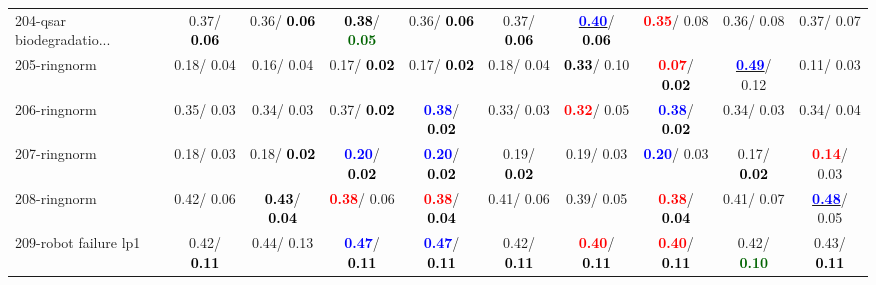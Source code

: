 \begin{table}[h]
\begin{center}
{\begin{tabular}{lc|c|c|c|c|c|c|c|c}
204-qsar biodegradatio... &   0.37/\textcolor{black}{\textbf{  0.06}} &   0.36/\textcolor{black}{\textbf{  0.06}} & \textcolor{black}{\textbf{  0.38}}/\textcolor{darkgreen}{\textbf{  0.05}} &   0.36/\textcolor{black}{\textbf{  0.06}} &   0.37/\textcolor{black}{\textbf{  0.06}} & \underline{\textcolor{blue}{\textbf{  0.40}}}/\textcolor{black}{\textbf{  0.06}} & \textcolor{red}{\textbf{  0.35}}/  0.08 &   0.36/  0.08 &   0.37/  0.07 \\
205-ringnorm &   0.18/  0.04 &   0.16/  0.04 &   0.17/\textcolor{black}{\textbf{  0.02}} &   0.17/\textcolor{black}{\textbf{  0.02}} &   0.18/  0.04 & \textcolor{black}{\textbf{  0.33}}/  0.10 & \textcolor{red}{\textbf{  0.07}}/\textcolor{black}{\textbf{  0.02}} & \underline{\textcolor{blue}{\textbf{  0.49}}}/  0.12 &   0.11/  0.03 \\
206-ringnorm &   0.35/  0.03 &   0.34/  0.03 &   0.37/\textcolor{black}{\textbf{  0.02}} & \textcolor{blue}{\textbf{  0.38}}/\textcolor{black}{\textbf{  0.02}} &   0.33/  0.03 & \textcolor{red}{\textbf{  0.32}}/  0.05 & \textcolor{blue}{\textbf{  0.38}}/\textcolor{black}{\textbf{  0.02}} &   0.34/  0.03 &   0.34/  0.04 \\ \hline
207-ringnorm &   0.18/  0.03 &   0.18/\textcolor{black}{\textbf{  0.02}} & \textcolor{blue}{\textbf{  0.20}}/\textcolor{black}{\textbf{  0.02}} & \textcolor{blue}{\textbf{  0.20}}/\textcolor{black}{\textbf{  0.02}} &   0.19/\textcolor{black}{\textbf{  0.02}} &   0.19/  0.03 & \textcolor{blue}{\textbf{  0.20}}/  0.03 &   0.17/\textcolor{black}{\textbf{  0.02}} & \textcolor{red}{\textbf{  0.14}}/  0.03 \\
208-ringnorm &   0.42/  0.06 & \textcolor{black}{\textbf{  0.43}}/\textcolor{black}{\textbf{  0.04}} & \textcolor{red}{\textbf{  0.38}}/  0.06 & \textcolor{red}{\textbf{  0.38}}/\textcolor{black}{\textbf{  0.04}} &   0.41/  0.06 &   0.39/  0.05 & \textcolor{red}{\textbf{  0.38}}/\textcolor{black}{\textbf{  0.04}} &   0.41/  0.07 & \underline{\textcolor{blue}{\textbf{  0.48}}}/  0.05 \\
209-robot failure lp1 &   0.42/\textcolor{black}{\textbf{  0.11}} &   0.44/  0.13 & \textcolor{blue}{\textbf{  0.47}}/\textcolor{black}{\textbf{  0.11}} & \textcolor{blue}{\textbf{  0.47}}/\textcolor{black}{\textbf{  0.11}} &   0.42/\textcolor{black}{\textbf{  0.11}} & \textcolor{red}{\textbf{  0.40}}/\textcolor{black}{\textbf{  0.11}} & \textcolor{red}{\textbf{  0.40}}/\textcolor{black}{\textbf{  0.11}} &   0.42/\textcolor{darkgreen}{\textbf{  0.10}} &   0.43/\textcolor{black}{\textbf{  0.11}} \\

\end{tabular}}
\end{center}
\end{table}
